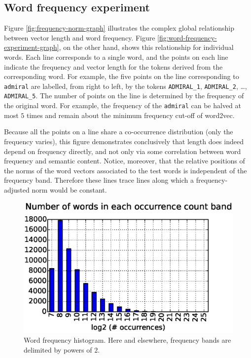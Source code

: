 \documentclass{article} %
\newcommand{\word}[1]{\texttt{#1}}
\begin{document}
\subsection{Word frequency experiment}
Figure \ref{fig:frequency-norm-graph} illustrates the complex global relationship between vector length and word frequency.
Figure \ref{fig:word-frequency-experiment-graph}, on the other hand, shows this relationship for individual words.
Each line corresponds to a single word, and the points on each line indicate the frequency and vector length for the tokens derived from the corresponding word.
For example, the five points on the line corresponding to \word{admiral} are labelled, from right to left, by the tokens \word{ADMIRAL\_1}, \word{ADMIRAL\_2}, \dots, \word{ADMIRAL\_5}.
The number of points on the line is determined by the frequency of the original word.
For example, the frequency of the \word{admiral} can be halved at most $5$ times and remain about the minimum frequency cut-off of word2vec.

Because all the points on a line share a co-occurrence distribution (only the frequency varies), this figure demonstrates conclusively that length does indeed depend on frequency directly, and not only via some correlation between word frequency and semantic content.
Notice, moreover, that the relative positions of the norms of the word vectors associated to the test words is independent of the frequency band.
Therefore these lines trace lines along which a frequency-adjusted norm would be constant.

\begin{figure}
\includegraphics[scale=0.5]{occurrence-histogram}
\caption{
	Word frequency histogram.
	Here and elsewhere, frequency bands are delimited by powers of $2$.
}
\label{fig:frequency-histogram}
\end{figure}
\end{document}
